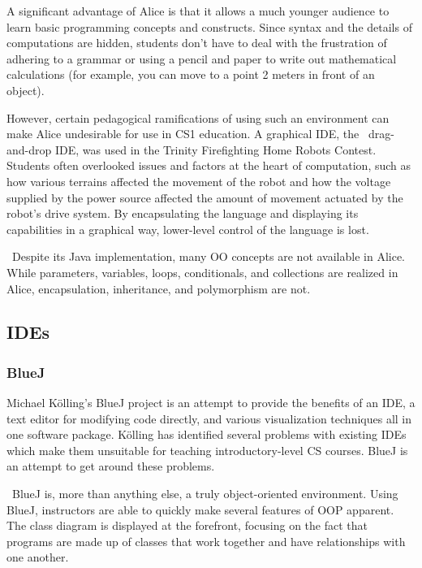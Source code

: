 \documentclass{sig-alt-release}
\begin{document}
    A significant advantage of Alice is that it allows a much younger audience
    to learn basic programming concepts and constructs. Since syntax and the
    details of computations are hidden, students don't have to deal with the
    frustration of adhering to a grammar or using a pencil and paper to write
    out mathematical calculations (for example, you can move to a point 2 meters
    in front of an object).
    
    However, certain pedagogical ramifications of using such an environment can
    make Alice undesirable for use in CS1 education. A graphical IDE, the
    \mindstorms\ drag-and-drop IDE, was used in the Trinity Firefighting Home
    Robots Contest. Students often overlooked issues and factors at the heart of
    computation, such as how various terrains affected the movement of the robot
    and how the voltage supplied by the power source affected the amount of
    movement actuated by the robot's drive system. By encapsulating the
    language and displaying its capabilities in a graphical way, lower-level
    control of the language is lost.

    \CFirstSteps\
    Despite its Java implementation, many OO concepts are not available in
    Alice. While parameters, variables, loops, conditionals, and collections are
    realized in Alice, encapsulation, inheritance, and polymorphism are not.

  \subsection{IDEs}
    \subsubsection{BlueJ}
      Michael K\"olling's BlueJ project is an attempt to provide the benefits of
      an IDE, a text editor for modifying code directly, and various
      visualization techniques all in one software package. K\"olling has
      identified several problems with existing IDEs which make them unsuitable
      for teaching introductory-level CS courses. BlueJ is an attempt to get
      around these problems.

      \CKollingBlueJPed\
      BlueJ is, more than anything else, a truly object-oriented environment.
      Using BlueJ, instructors are able to quickly make several features of OOP
      apparent. The class diagram is displayed at the forefront, focusing on the
      fact that programs are made up of classes that work together and have
      relationships with one another.
\end{document}
